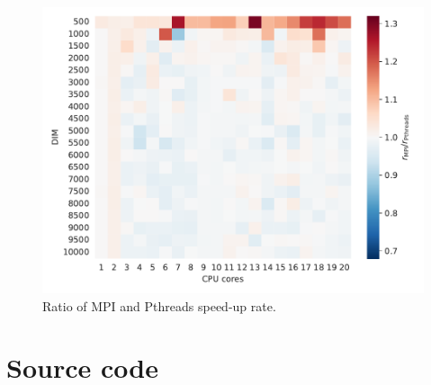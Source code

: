 \documentclass[twoside,12pt]{article}
\theoremstyle{definition}
\theoremstyle{remark}
\begin{document}
\begin{figure}[h!]
    \centering
    \includegraphics[width=\textwidth]{../analysis/mpi2pth.pdf}
    \caption{Ratio of MPI and Pthreads speed-up rate.}
    \label{fig:mpi2pth}
\end{figure}

\clearpage
\newpage
\section{Source code}











\end{document}

